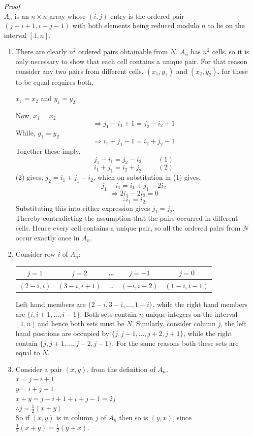 \documentclass[
  12pt,
  a4paper]{book}
\begin{document}
\emph{Proof}\\
\(A_n\) is an \(n \times n\) array whose \((i,j)\) entry is the ordered
pair \((j-i+1,i+j-1)\) with both elements being reduced modulo \(n\) to
lie on the interval \([1,n]\).

\begin{enumerate}
\def\labelenumi{\arabic{enumi}.}
\item
  There are clearly \(n^2\) ordered pairs obtainable from \(N\). \(A_n\)
  has \(n^2\) cells, so it is only necessary to show that each cell
  contains a unique pair. For that reason consider any two pairs from
  different cells, \((x_1,y_1)\) and \((x_2,y_2)\), for these to be
  equal requires both,

  \(x_1=x_2\) and \(y_1=y_2\)

  Now, \(x_1 = x_2\) \[\Rightarrow j_1-i_1 + 1 = j_2-i_2+1\] While,
  \(y_1=y_2\) \[\Rightarrow i_1+j_1 - 1 = i_2+j_2-1\] Together these
  imply, \[j_1-i_1=j_2-i_2 \hspace{1cm}(1)\]
  \[i_1+j_1=i_2+j_2 \hspace{1cm}(2)\] (2) gives, \(j_2=i_1+j_1-i_2\),
  which on substitution in (1) gives, \[j_1-i_1=i_1+j_1-2i_2\]
  \[\Rightarrow 2i_1-2i_2=0\] \[\therefore i_1=i_2\] Substituting this
  into either expression gives \(j_1 = j_2\).\\
  Thereby contradicting the assumption that the pairs occurred in
  different cells. Hence every cell contains a unique pair, so all the
  ordered pairs from \(N\) occur exactly once in \(A_n\).
\item
  Consider row \(i\) of \(A_n\):

  \begin{longtable}[]{@{}ccccc@{}}
  \toprule
  \(j=1\) & \(j=2\) & \ldots{} & \(j=-1\) & \(j=0\)\tabularnewline
  \midrule
  \endhead
  \((2-i,i)\) & \((3-i,i+1)\) & \ldots{} & \((-i,i-2)\) &
  \((1-i,i-1)\)\tabularnewline
  \bottomrule
  \end{longtable}

  Left hand members are \(\{2-i,3-i,...,1-i\}\), while the right hand
  members are \(\{i,i+1,...,i-1\}\). Both sets contain \(n\) unique
  integers on the interval \([1,n]\) and hence both sets must be \(N\),
  Similarly, consider column \(j\), the left hand positions are occupied
  by \(\{j,j-1,...,j+2,j+1\}\), while the right contain
  \(\{j,j+1,...,j-2,j-1\}\). For the same reasons both these sets are
  equal to \(N\).
\item
  Consider a pair \((x,y)\), from the definition of \(A_n\),\\
  \(x=j-i+1\)\\
  \(y=i+j-1\)\\
  \(x+y=j-i+1+i+j-1=2j\)\\
  \(\therefore j= \frac{1}{2} (x+y)\)\\
  So if \((x,y)\) is in column \(j\) of \(A_n\) then so is \((y,x)\),
  since \(\frac{1}{2}(x+y)=\frac{1}{2}(y+x)\).
\end{enumerate}
\end{document}
